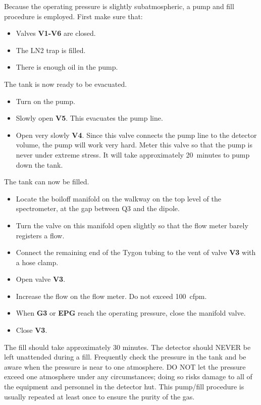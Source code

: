 \documentclass[12pt]{article}
\begin{document}
{Because the operating pressure is slightly subatmospheric, a pump and fill
procedure is employed.  First make sure that:
\begin{itemize}
\item Valves {\bf V1-V6} are closed.
\item The LN2 trap is filled.
\item There is enough oil in the pump.
\end{itemize}
The tank is now ready to be evacuated.
\begin{itemize}
\item Turn on the pump.
\item Slowly open {\bf V5}.  This evacuates the pump line.
\item Open very slowly {\bf V4}.  Since this valve connects the pump line to
the detector volume, the pump will work very hard.  Meter this valve
so that the pump is never under extreme stress.  It will take approximately
20~minutes to pump down the tank.
\end{itemize}
The tank can now be filled.
\begin{itemize}
\item Locate the boiloff manifold on the walkway on the top level of the
spectrometer, at the gap between Q3 and the dipole.
\item Turn the valve on this manifold open slightly so that the flow meter
barely registers a flow.
\item Connect the remaining end of the Tygon tubing to the vent of valve
{\bf V3} with a hose clamp.
\item Open valve {\bf V3}.
\item Increase the flow on the flow meter.  Do not exceed 100~cfpm.
\item When {\bf G3} or {\bf EPG} reach the operating pressure, close
the manifold valve.
\item Close {\bf V3}.
\end{itemize}
The fill should take approximately 30 minutes.  The detector should NEVER
be left unattended during a fill.  Frequently check the pressure in the tank
and be aware when the pressure is near to one atmosphere.  DO NOT let the pressure
exceed one atmosphere under any circumstances; doing so risks damage to all of
the equipment and personnel in the detector hut.  This pump/fill procedure is usually 
repeated at least once to ensure the purity of the gas.






}
\end{document}
